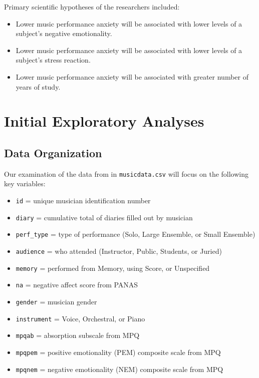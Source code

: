 \documentclass[
]{krantz}
\providecommand{\tightlist}{%
  \setlength{\itemsep}{0pt}\setlength{\parskip}{0pt}}
\begin{document}
Primary scientific hypotheses of the researchers included:

\begin{itemize}
\tightlist
\item
  Lower music performance anxiety will be associated with lower levels of a subject's negative emotionality.
\item
  Lower music performance anxiety will be associated with lower levels of a subject's stress reaction.
\item
  Lower music performance anxiety will be associated with greater number of years of study.
\end{itemize}

\hypertarget{explore}{%
\section{Initial Exploratory Analyses}\label{explore}}

\hypertarget{organizedata1}{%
\subsection{Data Organization}\label{organizedata1}}

Our examination of the data from \citet{Miller2010} in \texttt{musicdata.csv} will focus on the following key variables:

\begin{itemize}
\tightlist
\item
  \texttt{id} = unique musician identification number
\item
  \texttt{diary} = cumulative total of diaries filled out by musician
\item
  \texttt{perf\_type} = type of performance (Solo, Large Ensemble, or Small Ensemble)
\item
  \texttt{audience} = who attended (Instructor, Public, Students, or Juried)
\item
  \texttt{memory} = performed from Memory, using Score, or Unspecified
\item
  \texttt{na} = negative affect score from PANAS
\item
  \texttt{gender} = musician gender
\item
  \texttt{instrument} = Voice, Orchestral, or Piano
\item
  \texttt{mpqab} = absorption subscale from MPQ
\item
  \texttt{mpqpem} = positive emotionality (PEM) composite scale from MPQ
\item
  \texttt{mpqnem} = negative emotionality (NEM) composite scale from MPQ
\end{itemize}
\end{document}
